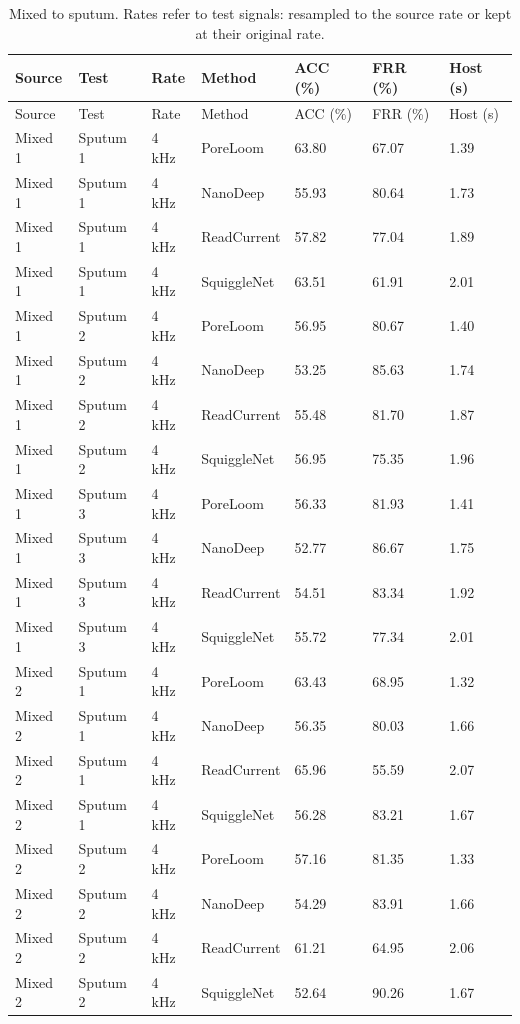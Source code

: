 \begin{longtable}{lllllll}
\caption{Mixed to sputum. Rates refer to test signals: resampled to the source rate or kept at their original rate.}\label{tab:s_reverse}\\
\toprule
Source & Test & Rate & Method & ACC (\%) & FRR (\%) & Host (s)\\\midrule\endfirsthead
\toprule
Source & Test & Rate & Method & ACC (\%) & FRR (\%) & Host (s)\\\midrule\endhead
\bottomrule\endfoot
Mixed 1 & Sputum 1 & 4 kHz & PoreLoom & 63.80 & 67.07 & 1.39\\
Mixed 1 & Sputum 1 & 4 kHz & NanoDeep & 55.93 & 80.64 & 1.73\\
Mixed 1 & Sputum 1 & 4 kHz & ReadCurrent & 57.82 & 77.04 & 1.89\\
Mixed 1 & Sputum 1 & 4 kHz & SquiggleNet & 63.51 & 61.91 & 2.01\\
Mixed 1 & Sputum 2 & 4 kHz & PoreLoom & 56.95 & 80.67 & 1.40\\
Mixed 1 & Sputum 2 & 4 kHz & NanoDeep & 53.25 & 85.63 & 1.74\\
Mixed 1 & Sputum 2 & 4 kHz & ReadCurrent & 55.48 & 81.70 & 1.87\\
Mixed 1 & Sputum 2 & 4 kHz & SquiggleNet & 56.95 & 75.35 & 1.96\\
Mixed 1 & Sputum 3 & 4 kHz & PoreLoom & 56.33 & 81.93 & 1.41\\
Mixed 1 & Sputum 3 & 4 kHz & NanoDeep & 52.77 & 86.67 & 1.75\\
Mixed 1 & Sputum 3 & 4 kHz & ReadCurrent & 54.51 & 83.34 & 1.92\\
Mixed 1 & Sputum 3 & 4 kHz & SquiggleNet & 55.72 & 77.34 & 2.01\\
Mixed 2 & Sputum 1 & 4 kHz & PoreLoom & 63.43 & 68.95 & 1.32\\
Mixed 2 & Sputum 1 & 4 kHz & NanoDeep & 56.35 & 80.03 & 1.66\\
Mixed 2 & Sputum 1 & 4 kHz & ReadCurrent & 65.96 & 55.59 & 2.07\\
Mixed 2 & Sputum 1 & 4 kHz & SquiggleNet & 56.28 & 83.21 & 1.67\\
Mixed 2 & Sputum 2 & 4 kHz & PoreLoom & 57.16 & 81.35 & 1.33\\
Mixed 2 & Sputum 2 & 4 kHz & NanoDeep & 54.29 & 83.91 & 1.66\\
Mixed 2 & Sputum 2 & 4 kHz & ReadCurrent & 61.21 & 64.95 & 2.06\\
Mixed 2 & Sputum 2 & 4 kHz & SquiggleNet & 52.64 & 90.26 & 1.67\\

\end{longtable}
